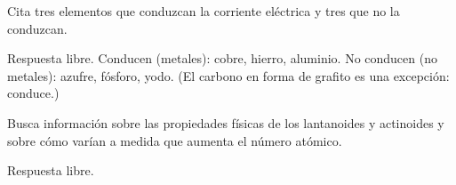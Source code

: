 \begin{exercise}
    Cita tres elementos que conduzcan la corriente eléctrica y tres que no la conduzcan.
    \begin{solu}
        Respuesta libre. Conducen (metales): cobre, hierro, aluminio. No conducen (no metales): azufre, fósforo, yodo. (El carbono en forma de grafito es una excepción: conduce.)
    \end{solu}
\end{exercise}

\begin{exercise}
    Busca información sobre las propiedades físicas de los lantanoides y actinoides y sobre cómo varían a medida que aumenta el número atómico.
    \begin{solu}
        Respuesta libre.
    \end{solu}
\end{exercise}

